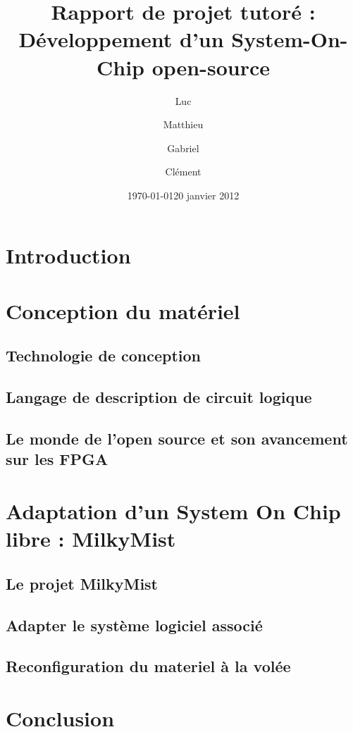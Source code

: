 \documentclass{report}
\date{\today}
\author{}
\title{}
\title{Rapport de projet tutoré : Développement d'un System-On-Chip open-source}
\author{\bsc{DUZAN} Luc \and \bsc{LONGO} Matthieu \and \bsc{FARACHE} Gabriel \and \bsc{MICHAUD} Clément }
\date{20 janvier 2012}
\begin{document}
\maketitle

\tableofcontents

\chapter*{Introduction}
    

\chapter{Conception du matériel}

\section{Technologie de conception}
    

\section{Langage de description de circuit logique}
    

\section{Le monde de l'open source et son avancement sur les FPGA}
    

\chapter{Adaptation d'un System On Chip libre : MilkyMist}

\section{Le projet MilkyMist}
    

\section{Adapter le système logiciel associé}
    
    \newpage

\section{Reconfiguration du materiel à la volée}
    
	\newpage

\chapter*{Conclusion}


\end{document}
